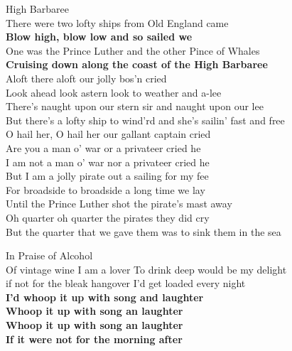 \documentclass[letterpaper,9pt]{article}
\begin{document}
\Huge
High Barbaree\\

\LARGE
There were two lofty ships from Old England came \\
\textbf{Blow high, blow low and so sailed we} \\
One was the Prince Luther and the other Pince of Whales \\
\textbf{Cruising down along the coast of the High Barbaree} \\

Aloft there aloft our jolly bos’n cried \\
Look ahead look astern look to weather and a-lee \\

There’s naught upon our stern sir and naught upon our lee \\
But there’s a lofty ship to wind’rd and she’s sailin’ fast and free \\

O hail her, O hail her our gallant captain cried \\
Are you a man o’ war or a privateer cried he \\

I am not a man o’ war nor a privateer cried he \\
But I am a jolly pirate out a sailing for my fee \\

For broadside to broadside a long time we lay \\
Until the Prince Luther shot the pirate’s mast away \\

Oh quarter oh quarter the pirates they did cry \\
But the quarter that we gave them was to sink them in the sea \\

\newpage
{}
\Huge
In Praise of Alcohol\\

\Large
Of vintage wine I am a lover To drink deep would be my delight \\
if not for the bleak hangover I'd get loaded every night \\

\textbf{I'd whoop it up with song and laughter \\
Whoop it up with song an laughter \\
Whoop it up with song an laughter \\
If it were not for the morning after} \\
\end{document}
